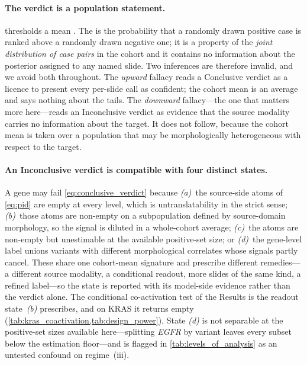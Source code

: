 \paragraph{The verdict is a population statement.}
 thresholds a mean \auroc{}.
The \auroc{} is the probability that a randomly drawn positive case
is ranked above a randomly drawn negative one; it is a property of
the \emph{joint distribution of case pairs} in the cohort and it
contains no information about the posterior assigned to any named
slide.
Two inferences are therefore invalid, and we avoid both throughout.
The \emph{upward} fallacy reads a Conclusive verdict as a licence to
present every per-slide call as confident; the cohort mean is an
average and says nothing about the tails.
The \emph{downward} fallacy---the one that matters more here---reads
an Inconclusive verdict as evidence that the source modality carries
no information about the target.
It does not follow, because the cohort mean is taken over a
population that may be morphologically heterogeneous with respect to
the target.

\paragraph{An Inconclusive verdict is compatible with four distinct
states.}
A gene may fail \cref{eq:conclusive_verdict} because
\emph{(a)}~the source-side atoms of \cref{eq:pid} are empty at every
level, which is untranslatability in the strict sense;
\emph{(b)}~those atoms are non-empty on a subpopulation defined by
source-domain morphology, so the signal is diluted in a whole-cohort
average;
\emph{(c)}~the atoms are non-empty but unestimable at the available
positive-set size; or
\emph{(d)}~the gene-level label unions variants with different
morphological correlates whose signals partly cancel.
These share one cohort-mean signature and prescribe different
remedies---a different source modality, a conditional readout, more
slides of the same kind, a refined label---so the state is reported with
its model-side evidence rather than the verdict alone. The conditional
co-activation test of the Results is the readout state~\emph{(b)}
prescribes, and on KRAS it returns empty
(\cref{tab:kras_coactivation,tab:design_power}). State \emph{(d)} is not
separable at the positive-set sizes available here---splitting
\textit{EGFR} by variant leaves every subset below the estimation
floor---and is flagged in \cref{tab:levels_of_analysis} as an untested
confound on regime~(iii).

